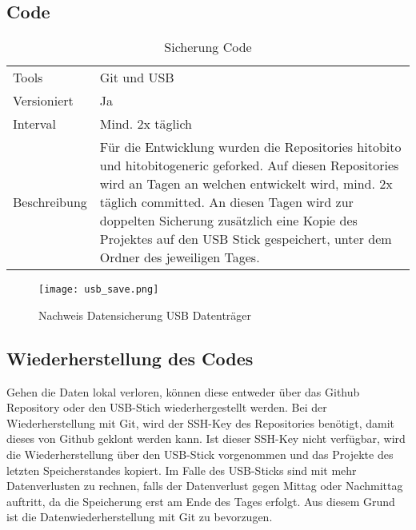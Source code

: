 \newpage

\subsection{Code}
\begin{table}[h!]
    \begin{tabular}{|L{0.4\textwidth}|L{0.5\textwidth}|}
        \hline
          \\[12pt]
        \hline
        Tools & Git und USB \\
        \hline
        Versioniert & Ja \\
        \hline
        Interval & Mind. 2x täglich \\
        \hline
        Beschreibung & Für die Entwicklung wurden die Repositories hitobito und hitobito\-generic geforked.
        Auf diesen Repositories wird an Tagen an welchen entwickelt wird, mind. 2x täglich committed. An diesen Tagen
        wird zur doppelten Sicherung zusätzlich eine Kopie des Projektes auf den USB Stick gespeichert, unter dem Ordner des jeweiligen Tages. \\
      \hline
      \end{tabular}
      \caption{Sicherung Code}
\end{table}

\begin{figure}[h]
    \centering
    \texttt{[image: usb\_save.png]}
    \caption{Nachweis Datensicherung USB Datenträger}
\end{figure}

\subsection{Wiederherstellung des Codes}
Gehen die Daten lokal verloren, können diese entweder über das Github Repository oder den USB-Stich wiederhergestellt werden.
Bei der Wiederherstellung mit Git, wird der SSH-Key des Repositories benötigt, damit dieses von Github geklont werden kann. Ist
dieser SSH-Key nicht verfügbar, wird die Wiederherstellung über den USB-Stick vorgenommen und das Projekte des letzten Speicherstandes
kopiert. Im Falle des USB-Sticks sind mit mehr Datenverlusten zu rechnen, falls der Datenverlust gegen Mittag oder Nachmittag auftritt, da
die Speicherung erst am Ende des Tages erfolgt. Aus diesem Grund ist die Datenwiederherstellung mit Git zu bevorzugen.

\newpage

